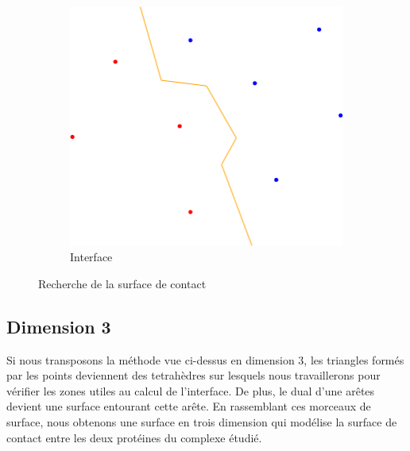 \begin{figure}[ht]
\begin{subfigure}{0.45\textwidth}
  \includegraphics[width=\textwidth]{figures/process_d_4.png}
  \caption{Interface}
  \label{fig::process_d_4}
\end{subfigure}
\caption{Recherche de la surface de contact}
\label{fig::delaunays_process_2}
\end{figure}


\subsection*{Dimension 3}

Si nous transposons la méthode vue ci-dessus en dimension 3, les triangles formés
par les points deviennent des tetrahèdres sur lesquels nous travaillerons pour vérifier
les zones utiles au calcul de l'interface.
De plus, le dual d'une arêtes devient une surface entourant cette arête. En rassemblant ces morceaux
de surface, nous obtenons une surface en trois dimension qui modélise la surface
de contact entre les deux protéines du complexe étudié.

